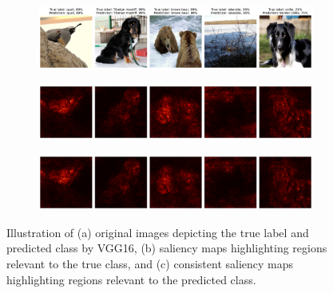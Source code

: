 \begin{figure}[H]
    \centering
    \begin{subfigure}{0.95\textwidth}
        \includegraphics[width=\textwidth]{good_images_vgg16}
        \caption{}
        \label{subfig:good_images_vgg16}
    \end{subfigure}
    \begin{subfigure}{0.95\textwidth}
        \includegraphics[width=\textwidth]{good_true_class_saliency_vgg16}
        \caption{}
        \label{subfig:good_true_class_saliency_vgg16}
    \end{subfigure}
    \begin{subfigure}{0.95\textwidth}
        \includegraphics[width=\textwidth]{good_predicted_class_saliency_vgg16}
        \caption{}
        \label{subfig:good_predicted_class_saliency_vgg16}
    \end{subfigure}
    \caption{Illustration of (a) original images depicting the true label and predicted class by VGG16, (b) saliency maps highlighting regions relevant to the true class, and (c) consistent saliency maps highlighting regions relevant to the predicted class.}
    \label{fig:good_saliency_map_vgg16}
\end{figure}



